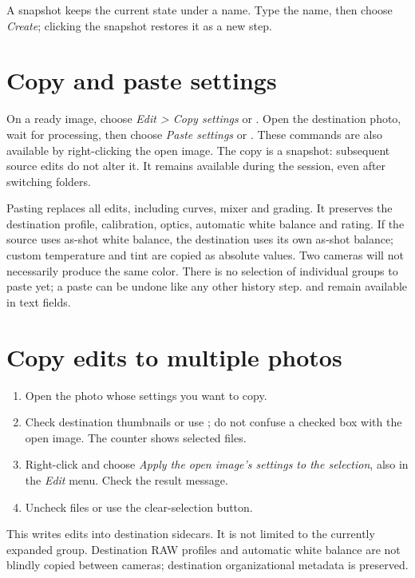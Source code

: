 A snapshot keeps the current state under a name. Type the name, then choose
\emph{Create}; clicking the snapshot restores it as a new step.


\section{Copy and paste settings}
On a ready image, choose \emph{Edit > Copy settings} or
. Open the destination photo, wait for processing,
then choose \emph{Paste settings} or .
These commands are also available by right-clicking the open image.
The copy is a snapshot: subsequent source edits do not alter it. It remains
available during the session, even after switching folders.

Pasting replaces all edits, including curves, mixer and grading. It preserves
the destination profile, calibration, optics, automatic white balance and
rating. If the source uses as-shot white balance, the destination uses its
own as-shot balance; custom temperature and tint are copied as absolute
values. Two cameras will not necessarily produce the same color.
There is no selection of individual groups to paste yet; a paste can be undone
like any other history step.
 and  remain available in text fields.

\section{Copy edits to multiple photos}
\begin{enumerate}
\item Open the photo whose settings you want to copy.
\item Check destination thumbnails or use ; do not
confuse a checked box with the open image. The counter shows selected files.
\item Right-click and choose \emph{Apply the open image's settings to the selection},
also in the \emph{Edit} menu. Check the result message.
\item Uncheck files or use the clear-selection button.
\end{enumerate}
This writes edits into destination sidecars. It is not limited to the currently
expanded group. Destination RAW profiles and automatic white balance are not
blindly copied between cameras; destination organizational metadata is preserved.

